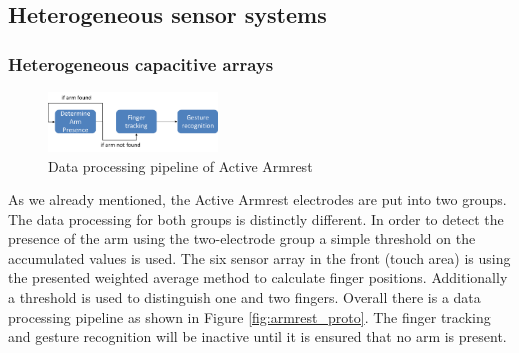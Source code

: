 \subsection{Heterogeneous sensor systems}
\subsubsection{Heterogeneous capacitive arrays}
\begin{figure}[h]
\centering
\includegraphics[width=0.4\textwidth]{images/armrest_dataproc}
\caption{Data processing pipeline of Active Armrest}
\label{fig:armrest_dataproc}
\end{figure}
As we already mentioned, the Active Armrest electrodes are put into two groups. The data processing for both groups is distinctly different. In order to detect the presence of the arm using the two-electrode group a simple threshold on the accumulated values is used. The six sensor array in the front (touch area) is using the presented weighted average method to calculate finger positions. Additionally a threshold is used to distinguish one and two fingers. Overall there is a data processing pipeline as shown in Figure \ref{fig:armrest_proto}. The finger tracking and gesture recognition will be inactive until it is ensured that no arm is present. 


